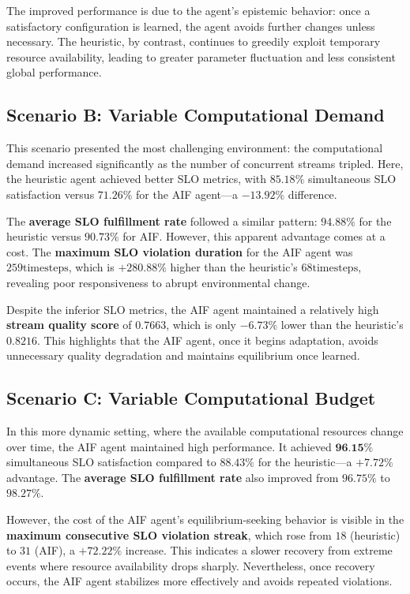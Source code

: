 The improved performance is due to the agent’s epistemic behavior: once a satisfactory configuration is learned, the agent avoids further changes unless necessary. The heuristic, by contrast, continues to greedily exploit temporary resource availability, leading to greater parameter fluctuation and less consistent global performance.

\subsection{Scenario B: Variable Computational Demand}

This scenario presented the most challenging environment: the computational demand increased significantly as the number of concurrent streams tripled. Here, the heuristic agent achieved better SLO metrics, with \(85.18\%\) simultaneous SLO satisfaction versus \(71.26\%\) for the AIF agent---a \(-13.92\%\) difference.

The \textbf{average SLO fulfillment rate} followed a similar pattern: \(94.88\%\) for the heuristic versus \(90.73\%\) for AIF. However, this apparent advantage comes at a cost. The \textbf{maximum SLO violation duration} for the AIF agent was \(259\text{timesteps}\), which is \(+280.88\%\) higher than the heuristic’s \(68\text{timesteps}\), revealing poor responsiveness to abrupt environmental change.

Despite the inferior SLO metrics, the AIF agent maintained a relatively high \textbf{stream quality score} of \(0.7663\), which is only \(-6.73\%\) lower than the heuristic’s \(0.8216\). This highlights that the AIF agent, once it begins adaptation, avoids unnecessary quality degradation and maintains equilibrium once learned.

\subsection{Scenario C: Variable Computational Budget}

In this more dynamic setting, where the available computational resources change over time, the AIF agent maintained high performance. It achieved \(\textbf{96.15}\%\) simultaneous SLO satisfaction compared to \(88.43\%\) for the heuristic---a \(+7.72\%\) advantage. The \textbf{average SLO fulfillment rate} also improved from \(96.75\%\) to \(98.27\%\).

However, the cost of the AIF agent’s equilibrium-seeking behavior is visible in the \textbf{maximum consecutive SLO violation streak}, which rose from \(18\) (heuristic) to \(31\) (AIF), a \(+72.22\%\) increase. This indicates a slower recovery from extreme events where resource availability drops sharply. Nevertheless, once recovery occurs, the AIF agent stabilizes more effectively and avoids repeated violations.


